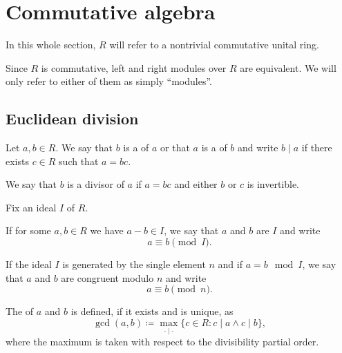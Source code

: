 \section{Commutative algebra}\label{sec:commutative_algebra}

\begin{remark}\label{remark:polynomial_commutative_ring}
  In this whole section, \( R \) will refer to a nontrivial commutative unital ring.

  Since \( R \) is commutative, left and right modules over \( R \) are equivalent. We will only refer to either of them as simply \enquote{modules}.
\end{remark}

\subsection{Euclidean division}\label{subsec:euclidean_division}

\begin{definition}\label{def:commutative_ring_division}
  Let \( a, b \in R \). We say that \( b \) is a  of \( a \) or that \( a \) is a  of \( b \) and write \( b \mid a \) if there exists \( c \in R \) such that \( a = bc \).

  We say that \( b \) is a  divisor of \( a \) if \( a = bc \) and either \( b \) or \( c \) is invertible.
\end{definition}

\begin{definition}\label{def:modulo}
  Fix an ideal \( I \) of \( R \).

  If for some \( a, b \in R \) we have \( a - b \in I \), we say that \( a \) and \( b \) are  \( I \) and write
  \begin{equation*}
    a \equiv b \pmod I.
  \end{equation*}

  If the ideal \( I \) is generated by the single element \( n \) and if \( a = b \mod I \), we say that \( a \) and \( b \) are congruent modulo \( n \) and write
  \begin{equation*}
    a \equiv b \pmod n.
  \end{equation*}
\end{definition}

\begin{definition}\label{def:greatest_common_denominator}
  The   of \( a \) and \( b \) is defined, if it exists and is unique, as
  \begin{equation*}
    \gcd(a, b) \coloneqq \max_{\cdot \mid \cdot} \{ c \in R : c \mid a \land c \mid b \},
  \end{equation*}
  where the maximum is taken with respect to the divisibility partial order.
\end{definition}

